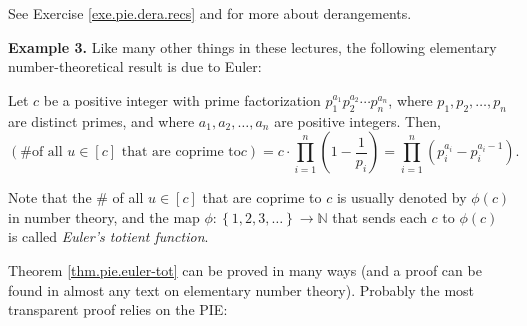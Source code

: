 See Exercise \ref{exe.pie.dera.recs} and \cite[Chapter 1]{Wildon19} for more
about derangements.

\bigskip

\textbf{Example 3.} Like many other things in these lectures, the following
elementary number-theoretical result is due to Euler:

\begin{theorem}
\label{thm.pie.euler-tot}Let $c$ be a positive integer with prime
factorization $p_{1}^{a_{1}}p_{2}^{a_{2}}\cdots p_{n}^{a_{n}}$, where
$p_{1},p_{2},\ldots,p_{n}$ are distinct primes, and where $a_{1},a_{2}%
,\ldots,a_{n}$ are positive integers. Then,%
\[
\left(  \text{\# of all }u\in\left[  c\right]  \text{ that are coprime to
}c\right)  =c\cdot\prod_{i=1}^{n}\left(  1-\dfrac{1}{p_{i}}\right)
=\prod_{i=1}^{n}\left(  p_{i}^{a_{i}}-p_{i}^{a_{i}-1}\right)  .
\]

\end{theorem}

Note that the \# of all $u\in\left[  c\right]  $ that are coprime to $c$ is
usually denoted by $\phi\left(  c\right)  $ in number theory, and the map
$\phi:\left\{  1,2,3,\ldots\right\}  \rightarrow\mathbb{N}$ that sends each
$c$ to $\phi\left(  c\right)  $ is called \emph{Euler's totient function}.

Theorem \ref{thm.pie.euler-tot} can be proved in many ways (and a proof can be
found in almost any text on elementary number theory). Probably the most
transparent proof relies on the PIE:

